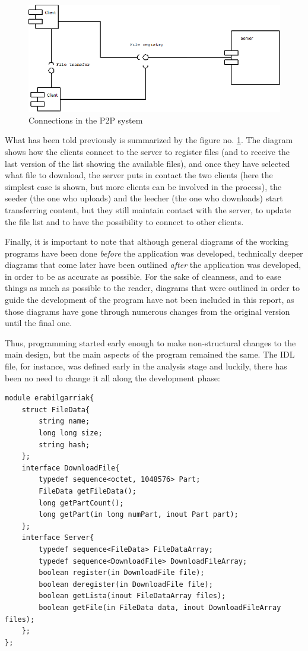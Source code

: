 \begin{figure}
   \centering
   \includegraphics[scale=0.5]{irudiak/Loturak.png}
   \caption{Connections in the P2P system}
   \label{fig:lotura}
\end{figure}

What has been told previously is summarized by the figure no. \ref{fig:lotura}. The diagram shows how the clients connect to the server to register files (and to receive the last version of the list showing the available files), and once they have selected what file to download, the server puts in contact the two clients (here the simplest case is shown, but more clients can be involved in the process), the seeder (the one who uploads) and the leecher (the one who downloads) start transferring content, but they still maintain contact with the server, to update the file list and to have the possibility to connect to other clients.

Finally, it is important to note that although general diagrams of the working programs have been done \textit{before} the application was developed, technically deeper diagrams that come later have been outlined \textit{after} the application was developed, in order to be as accurate as possible. For the sake of cleanness, and to ease things as much as possible to the reader, diagrams that were outlined in order to guide the development of the program have not been included in this report, as those diagrams have gone through numerous changes from the original version until the final one.

Thus, programming started early enough to make non-structural changes to the main design, but the main aspects of the program remained the same. The IDL file, for instance, was defined early in the analysis stage and luckily, there has been no need to change it all along the development phase:

\begin{lstlisting}[language=IDL]
module erabilgarriak{
	struct FileData{
		string name;
		long long size;
		string hash;
	};
	interface DownloadFile{
		typedef sequence<octet, 1048576> Part;
		FileData getFileData();
		long getPartCount();
		long getPart(in long numPart, inout Part part);
	};
	interface Server{
		typedef sequence<FileData> FileDataArray;
		typedef sequence<DownloadFile> DownloadFileArray;
		boolean register(in DownloadFile file);
		boolean deregister(in DownloadFile file);
		boolean getLista(inout FileDataArray files);
		boolean getFile(in FileData data, inout DownloadFileArray files);
	};
};
\end{lstlisting}
 
